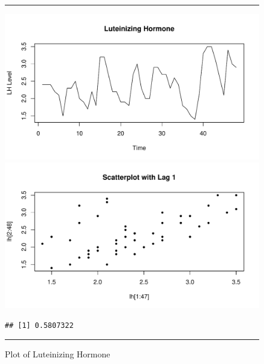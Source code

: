 \documentclass[11pt, letterpaper, twoside]{memoir}\usepackage{knitr}
\begin{document}
\begin{figure}
\centering
\rule{4in}{1pt}
\begin{knitrout}
\color{fgcolor}\begin{kframe}
\begin{alltt}
\hlstd{(}\hlstd{)} 
 \hlstd{=}\hlstd{,} \hlstd{=}\hlstd{)}
\end{alltt}
\end{kframe}
\includegraphics[width=\maxwidth]{figure/unnamed-chunk-104-1} 
\begin{kframe}\begin{alltt}
\hlstd{(lh[}\hlopt{:}\hlstd{], lh[}\hlopt{:}\hlstd{],} \hlstd{=}\hlstd{)}
\hlstd{(}\hlstd{)}
\end{alltt}
\end{kframe}
\includegraphics[width=\maxwidth]{figure/unnamed-chunk-104-2} 
\begin{kframe}\begin{alltt}
\hlstd{(lh[}\hlopt{:}\hlstd{], lh[}\hlopt{:}\hlstd{])}
\end{alltt}
\begin{verbatim}
## [1] 0.5807322
\end{verbatim}
\end{kframe}
\end{knitrout}
\caption{Plot of Luteinizing Hormone}
\label{Fig:lute}
\rule{4in}{1pt}
\end{figure}
\end{document}
